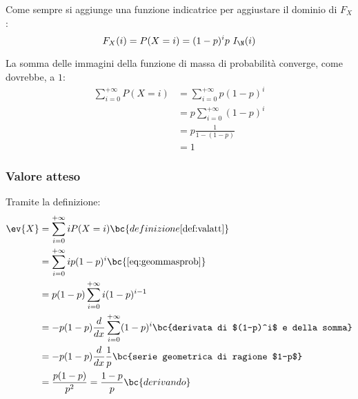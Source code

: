 Come sempre si aggiunge una funzione indicatrice per aggiustare il dominio di $F_X$:
\begin{equation} \label{eq:geommasprob}
	F_X(i) = P(X=i) = (1-p)^ip ~ I_\N (i)
\end{equation}

La somma delle immagini della funzione di massa di probabilità converge, come dovrebbe, a $1$:
\begin{align*}
	\sum_{i=0}^{+\infty} P(X=i) & = \sum_{i=0}^{+\infty} p(1-p)^i \\
	                            & = p\sum_{i=0}^{+\infty} (1-p)^i \\
	                            & = p\frac{1}{1-(1-p)}            \\
	                            & = 1
\end{align*}


\subsubsection{Valore atteso}
Tramite la definizione:
\begin{align*}
	\ev{X} & = \sum_{i=0}^{+\infty} i P(X=i)                    \bc{definizione \ref{def:valatt}}         \\
	       & = \sum_{i=0}^{+\infty} ip(1-p)^i                   \bc{\eqref{eq:geommasprob}}               \\
	       & = p(1-p)\sum_{i=0}^{+\infty} i(1-p)^{i-1}                                                    \\
	       & = -p(1-p) \frac{d}{dx} \sum_{i=0}^{+\infty} (1-p)^i \bc{derivata di $(1-p)^i$ e della somma} \\
	       & = -p(1-p) \frac{d}{dx} \frac{1}{p}                  \bc{serie geometrica di ragione $1-p$}   \\
	       & = \frac{p(1-p)}{p^2} = \frac{1-p}{p}                 \bc{derivando}
\end{align*}


